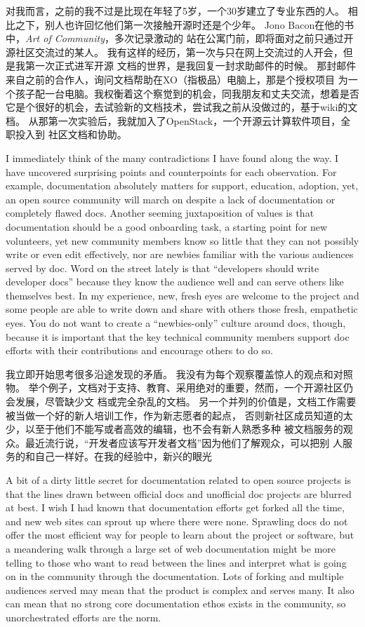 对我而言，之前的我不过是比现在年轻了5岁，一个30岁建立了专业东西的人。
相比之下，别人也许回忆他们第一次接触开源时还是个少年。
Jono Bacon在他的书中，\textit{Art of Community}，多次记录激动的
站在公寓门前，即将面对之前只通过开源社区交流过的某人。
我有这样的经历，第一次与只在网上交流过的人开会，但是我第一次正式进军开源
文档的世界，是我回复一封求助邮件的时候。
那封邮件来自之前的合作人，询问文档帮助在XO（指极品）电脑上，那是个授权项目
为一个孩子配一台电脑。我权衡着这个察觉到的机会，同我朋友和丈夫交流，想着是否
它是个很好的机会，去试验新的文档技术，尝试我之前从没做过的，基于wiki的文档。
从那第一次实验后，我就加入了OpenStack，一个开源云计算软件项目，全职投入到
社区文档和协助。

I immediately think of the many contradictions I have found along the way. I
have uncovered surprising points and counterpoints for each observation. For
example, documentation absolutely matters for support, education, adoption, yet,
an open source community will march on despite a lack of documentation or
completely flawed docs. Another seeming juxtaposition of values is that
documentation should be a good onboarding task, a starting point for new
volunteers, yet new community members know so little that they can not possibly
write or even edit effectively, nor are newbies familiar with the various
audiences served by doc. Word on the street lately is that ``developers should
write developer docs'' because they know the audience well and can serve others
like themselves best. In my experience, new, fresh eyes are welcome to the
project and some people are able to write down and share with others those
fresh, empathetic eyes. You do not want to create a ``newbies-only'' culture
around docs, though, because it is important that the key technical community
members support doc efforts with their contributions and encourage others to do
so. 

我立即开始思考很多沿途发现的矛盾。
我没有为每个观察覆盖惊人的观点和对照物。
举个例子，文档对于支持、教育、采用绝对的重要，然而，一个开源社区仍会发展，尽管缺少文
档或完全杂乱的文档。
另一个并列的价值是，文档工作需要被当做一个好的新人培训工作，作为新志愿者的起点，
否则新社区成员知道的太少，以至于他们不能写或者高效的编辑，也不会有新人熟悉多种
被文档服务的观众。最近流行说，``开发者应该写开发者文档''因为他们了解观众，可以把别
人服务的和自己一样好。在我的经验中，新兴的眼光

A bit of a dirty little secret for documentation related to open source projects
is that the lines drawn between official docs and unofficial doc projects are
blurred at best. I wish I had known that documentation efforts get forked all
the time, and new web sites can sprout up where there were none. Sprawling docs
do not offer the most efficient way for people to learn about the project or
software, but a meandering walk through a large set of web documentation might
be more telling to those who want to read between the lines and interpret what
is going on in the community through the documentation. Lots of forking and
multiple audiences served may mean that the product is complex and serves many.
It also can mean that no strong core documentation ethos exists in the
community, so unorchestrated efforts are the norm. 

